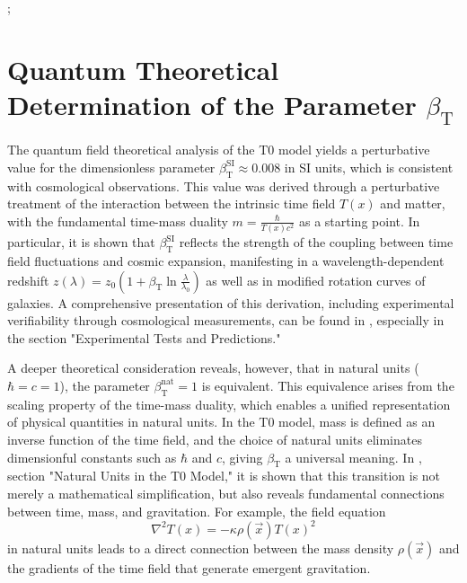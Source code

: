 \documentclass[12pt,a4paper]{article}
\newcommand{\Tfield}{T(x)}
\newcommand{\betaT}{\beta_{\text{T}}}
\newcommand{\vecx}{\vec{x}}
\begin{document}
	\begin{center}
		;
	\end{center}
	
	\section{Quantum Theoretical Determination of the Parameter \(\betaT\)}
	
	The quantum field theoretical analysis of the T0 model yields a perturbative value for the dimensionless parameter \(\betaT^{\text{SI}} \approx 0.008\) in SI units, which is consistent with cosmological observations. This value was derived through a perturbative treatment of the interaction between the intrinsic time field \(\Tfield\) and matter, with the fundamental time-mass duality \(m = \frac{\hbar}{\Tfield c^2}\) as a starting point. In particular, it is shown that \(\betaT^{\text{SI}}\) reflects the strength of the coupling between time field fluctuations and cosmic expansion, manifesting in a wavelength-dependent redshift \(z(\lambda) = z_0 \left(1 + \betaT \ln \frac{\lambda}{\lambda_0}\right)\) as well as in modified rotation curves of galaxies. A comprehensive presentation of this derivation, including experimental verifiability through cosmological measurements, can be found in \cite{pascher_emergente_gravitation_2025}, especially in the section "Experimental Tests and Predictions."
	
	A deeper theoretical consideration reveals, however, that in natural units (\(\hbar = c = 1\)), the parameter \(\betaT^{\text{nat}} = 1\) is equivalent. This equivalence arises from the scaling property of the time-mass duality, which enables a unified representation of physical quantities in natural units. In the T0 model, mass is defined as an inverse function of the time field, and the choice of natural units eliminates dimensionful constants such as \(\hbar\) and \(c\), giving \(\betaT\) a universal meaning. In \cite{pascher_emergente_gravitation_2025}, section "Natural Units in the T0 Model," it is shown that this transition is not merely a mathematical simplification, but also reveals fundamental connections between time, mass, and gravitation. For example, the field equation 
	\begin{equation}
		\nabla^2 \Tfield = -\kappa \rho(\vecx) \Tfield^2
	\end{equation}
	in natural units leads to a direct connection between the mass density \(\rho(\vecx)\) and the gradients of the time field that generate emergent gravitation.
	
\end{document}

